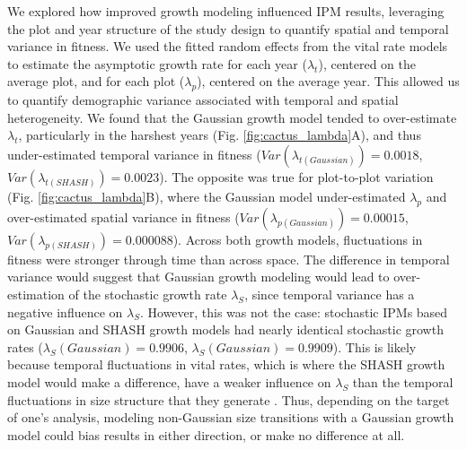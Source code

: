 \documentclass[12pt]{article}
\begin{document}
We explored how improved growth modeling influenced IPM results, leveraging the plot and year structure of the study design to quantify spatial and temporal variance in fitness.
We used the fitted random effects from the vital rate models to estimate the asymptotic growth rate for each year ($\lambda_t$), centered on the average plot, and for each plot ($\lambda_p$), centered on the average year.
This allowed us to quantify demographic variance associated with temporal and spatial heterogeneity. 
We found that the Gaussian growth model tended to over-estimate $\lambda_t$, particularly in the harshest years (Fig. \ref{fig:cactus_lambda}A), and thus under-estimated temporal variance in fitness ($Var(\lambda_{t(Gaussian)})=0.0018$, $Var(\lambda_{t(SHASH)})=0.0023$). 
The opposite was true for plot-to-plot variation (Fig. \ref{fig:cactus_lambda}B), where the Gaussian model under-estimated $\lambda_p$ and over-estimated spatial variance in fitness ($Var(\lambda_{p(Gaussian)})=0.00015$, $Var(\lambda_{p(SHASH)})=0.000088$). 
Across both growth models, fluctuations in fitness were stronger through time than across space. 
The difference in temporal variance would suggest that Gaussian growth modeling would lead to over-estimation of the stochastic growth rate $\lambda_S$, since temporal variance has a negative influence on $\lambda_S$.
However, this was not the case: stochastic IPMs based on Gaussian and SHASH growth models had nearly identical stochastic growth rates ($\lambda_S(Gaussian)=0.9906$, $\lambda_S(Gaussian)=0.9909$). 
This is likely because temporal fluctuations in vital rates, which is where the SHASH growth model would make a difference, have a weaker influence on $\lambda_S$ than the temporal fluctuations in size structure that they generate \citep{ellis2013role,compagnoni2016effect}. 
Thus, depending on the target of one's analysis, modeling non-Gaussian size transitions with a Gaussian growth model could bias results in either direction, or make no difference at all. 

\end{document}
